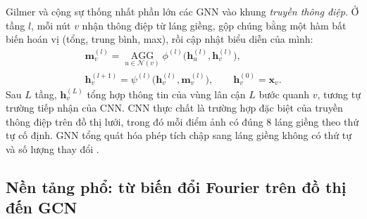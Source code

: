 Gilmer và cộng sự \cite{gilmer2017} thống nhất phần lớn các GNN vào khung \emph{truyền thông điệp}. Ở tầng $l$, mỗi nút $v$ nhận thông điệp từ láng giềng, gộp chúng bằng một hàm bất biến hoán vị (tổng, trung bình, max), rồi cập nhật biểu diễn của mình:
\begin{equation}
\begin{gathered}
\mathbf m_v^{(l)} = \operatorname*{AGG}_{u\in\mathcal N(v)} \phi^{(l)}\big(\mathbf h_u^{(l)}, \mathbf h_v^{(l)}\big), \\
\mathbf h_v^{(l+1)} = \psi^{(l)}\big(\mathbf h_v^{(l)}, \mathbf m_v^{(l)}\big),\qquad \mathbf h_v^{(0)} = \mathbf x_v .
\end{gathered}
\label{eq:mp}
\end{equation}
Sau $L$ tầng, $\mathbf h_v^{(L)}$ tổng hợp thông tin của vùng lân cận $L$ bước quanh $v$, tương tự trường tiếp nhận của CNN. CNN thực chất là trường hợp đặc biệt của truyền thông điệp trên đồ thị lưới, trong đó mỗi điểm ảnh có đúng 8 láng giềng theo thứ tự cố định. GNN tổng quát hóa phép tích chập sang láng giềng không có thứ tự và số lượng thay đổi \cite{wu2021gnn}.

\subsection{Nền tảng phổ: từ biến đổi Fourier trên đồ thị đến GCN}

